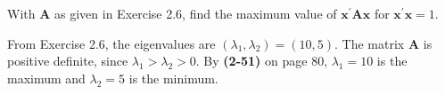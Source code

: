         With $\mathbf{A}$ as given in Exercise 2.6, find the maximum value of $\mathbf{x}^\prime\mathbf{A}\mathbf{x}$ for $\mathbf{x}^\prime\mathbf{x} = 1$.
        \newline
        \par
        From Exercise 2.6, the eigenvalues are $(\lambda_1, \lambda_2) = (10, 5)$. The matrix $\textbf{A}$ is positive definite, since $\lambda_1 > \lambda_2 > 0$.
        By \textbf{(2-51)} on page 80, $\lambda_1 = 10$ is the maximum and $\lambda_2 = 5$ is the minimum.